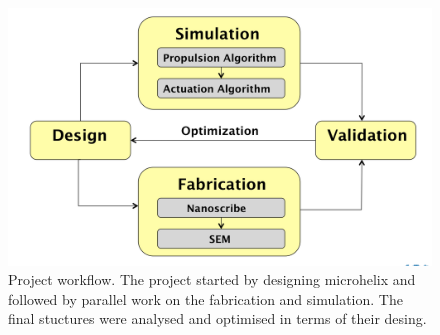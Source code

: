 \documentclass[12pt,a4paper,titlepage]{report}
\begin{document}
\begin{figure}
        \centering
                \includegraphics[width=\textwidth]{overview_Dig1}
        \caption[Project workflow]{Project workflow. The project started by designing microhelix and followed by parallel work on the
fabrication and simulation. The final stuctures were analysed and optimised in terms of their desing.}\label{overview_Dig1}

       

\end{figure}
\end{document}
